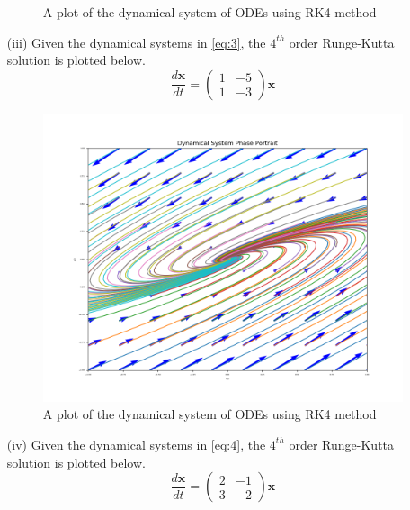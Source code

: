 \documentclass[12pt,a4paper]{article}
\begin{document}
\begin{enumerate}
\begin{figure}[!h]
										\caption{A plot of the dynamical system of ODEs using RK4 method}
										\label{fig:q2}
								\end{figure}
					\item[(iii)] Given the dynamical systems in \eqref{eq:3}, the $4^{th}$ order Runge-Kutta solution is plotted below.
				\begin{equation}
						  \frac{d\mathbf{x}}{dt} =  \begin{pmatrix}
		  								1 &  -5\\
		  								1 & -3
		  						\end{pmatrix} \mathbf{x}
						\label{eq:3}
			  \end{equation}
					\begin{figure}[!h]
									\includegraphics[width=480pt,  height=240pt]{./graphics/q001_c.png}
										\caption{A plot of the dynamical system of ODEs using RK4 method}
										\label{fig:q3}
								\end{figure}
								\item[(iv)] Given the dynamical systems in \eqref{eq:4}, the $4^{th}$ order Runge-Kutta solution is plotted below.
				\begin{equation}
						  \frac{d\mathbf{x}}{dt} =  \begin{pmatrix}
		  								2 &  -1\\
		  								 3 &  -2
		  						\end{pmatrix} \mathbf{x}
						\label{eq:4}
			  \end{equation}
					\begin{figure}[!h]

\end{figure}
\end{enumerate}
\end{document}
